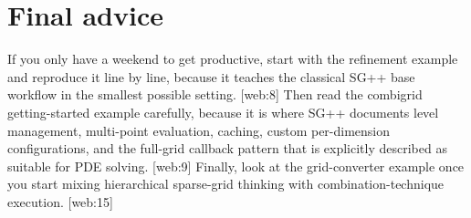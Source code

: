 \documentclass[11pt,a4paper]{article}
\begin{document}
\section{Final advice}

If you only have a weekend to get productive, start with the refinement example and reproduce it line by line, because it teaches the classical SG++ base workflow in the smallest possible setting. [web:8]  
Then read the combigrid getting-started example carefully, because it is where SG++ documents level management, multi-point evaluation, caching, custom per-dimension configurations, and the full-grid callback pattern that is explicitly described as suitable for PDE solving. [web:9]  
Finally, look at the grid-converter example once you start mixing hierarchical sparse-grid thinking with combination-technique execution. [web:15]  
\end{document}
